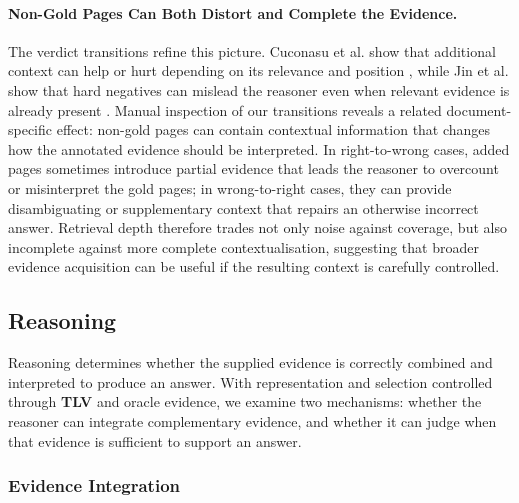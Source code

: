 \paragraph{Non-Gold Pages Can Both Distort and Complete the Evidence.} The verdict transitions refine this picture. Cuconasu et al. show that additional context can help or hurt depending on its relevance and position \citep{cuconasu2024power}, while Jin et al. show that hard negatives can mislead the reasoner even when relevant evidence is already present \citep{jin2025long}. Manual inspection of our transitions reveals a related document-specific effect: non-gold pages can contain contextual information that changes how the annotated evidence should be interpreted. In right-to-wrong cases, added pages sometimes introduce partial evidence that leads the reasoner to overcount or misinterpret the gold pages; in wrong-to-right cases, they can provide disambiguating or supplementary context that repairs an otherwise incorrect answer. Retrieval depth therefore trades not only noise against coverage, but also incomplete against more complete contextualisation, suggesting that broader evidence acquisition can be useful if the resulting context is carefully controlled.


\subsection{Reasoning}
\label{sec:findings_reasoning}

Reasoning determines whether the supplied evidence is correctly combined and interpreted to produce an answer. With representation and selection controlled through \textbf{TLV} and oracle evidence, we examine two mechanisms: whether the reasoner can integrate complementary evidence, and whether it can judge when that evidence is sufficient to support an answer.

\subsubsection{Evidence Integration}


